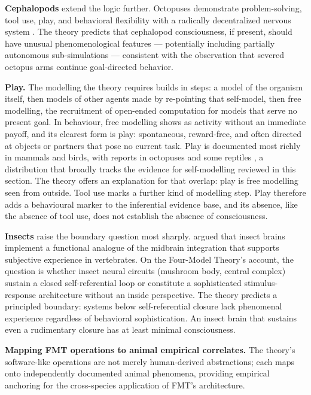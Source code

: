 \documentclass[12pt]{article}
\begin{document}
\textbf{Cephalopods} extend the logic further. Octopuses demonstrate problem-solving, tool use, play, and behavioral flexibility with a radically decentralized nervous system \citep{GodfreySmith2016}. The theory predicts that cephalopod consciousness, if present, should have unusual phenomenological features --- potentially including partially autonomous sub-simulations --- consistent with the observation that severed octopus arms continue goal-directed behavior.

\textbf{Play.} The modelling the theory requires builds in steps: a model of the organism itself, then models of other agents made by re-pointing that self-model, then free modelling, the recruitment of open-ended computation for models that serve no present goal. In behaviour, free modelling shows as activity without an immediate payoff, and its clearest form is play: spontaneous, reward-free, and often directed at objects or partners that pose no current task. Play is documented most richly in mammals and birds, with reports in octopuses and some reptiles \citep{Burghardt2005}, a distribution that broadly tracks the evidence for self-modelling reviewed in this section. The theory offers an explanation for that overlap: play is free modelling seen from outside. Tool use marks a further kind of modelling step. Play therefore adds a behavioural marker to the inferential evidence base, and its absence, like the absence of tool use, does not establish the absence of consciousness.

\textbf{Insects} raise the boundary question most sharply. \citet{BarronKlein2016} argued that insect brains implement a functional analogue of the midbrain integration that supports subjective experience in vertebrates. On the Four-Model Theory's account, the question is whether insect neural circuits (mushroom body, central complex) sustain a closed self-referential loop or constitute a sophisticated stimulus-response architecture without an inside perspective. The theory predicts a principled boundary: systems below self-referential closure lack phenomenal experience regardless of behavioral sophistication. An insect brain that sustains even a rudimentary closure has at least minimal consciousness.

\textbf{Mapping FMT operations to animal empirical correlates.} The theory's software-like operations are not merely human-derived abstractions; each maps onto independently documented animal phenomena, providing empirical anchoring for the cross-species application of FMT's architecture.
\end{document}
